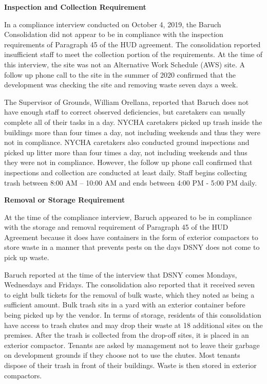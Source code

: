 

\textbf{Inspection and Collection Requirement}

In a compliance interview conducted on October 4, 2019, the Baruch Consolidation did not appear to be in compliance with the inspection requirements of Paragraph 45 of the HUD agreement. The consolidation reported insufficient staff to meet the collection portion of the requirements. At the time of this interview, the site was not an Alternative Work Schedule (AWS) site.  A follow up phone call to the site in the summer of 2020 confirmed that the development was checking the site and removing waste seven days a week.

The Supervisor of Grounds, William Orellana, reported that Baruch does not have enough staff to correct observed deficiencies, but caretakers can usually complete all of their tasks in a day. NYCHA caretakers picked up trash inside the buildings more than four times a day, not including weekends and thus they were not in compliance. NYCHA caretakers also conducted ground inspections and picked up litter more than four times a day, not including weekends and thus they were not in compliance. However, the follow up phone call confirmed that inspections and collection are conducted at least daily. Staff begins collecting trash between 8:00 AM -- 10:00 AM and ends between 4:00 PM - 5:00 PM daily. 

\textbf{Removal or Storage Requirement}

At the time of the compliance interview, Baruch appeared to be in compliance with the storage and removal requirement of Paragraph 45 of the HUD Agreement because it does have containers in the form of exterior compactors to store waste in a manner that prevents pests on the days DSNY does not come to pick up waste. 

Baruch reported at the time of the interview that DSNY comes Mondays, Wednesdays and Fridays. The consolidation also reported that it received seven to eight bulk tickets for the removal of bulk waste, which they noted as being a sufficient amount. Bulk trash sits in a yard with an exterior container before being picked up by the vendor. In terms of storage, residents of this consolidation have access to trash chutes and may drop their waste at 18 additional sites on the premises.  After the trash is collected from the drop-off sites, it is placed in an exterior compactor. Tenants are asked by management not to leave their garbage on development grounds if they choose not to use the chutes. Most tenants dispose of their trash in front of their buildings. Waste is then stored in exterior compactors. 

